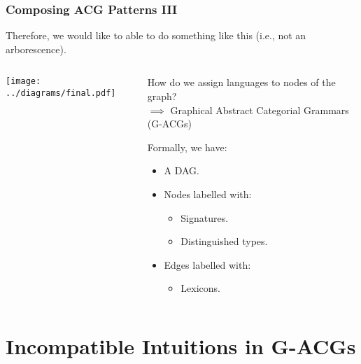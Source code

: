 \documentclass{beamer}
\begin{document}
\begin{frame}
  \frametitle{Composing ACG Patterns III}

  Therefore, we would like to able to do something like this (i.e., not
  an arborescence).

  \begin{columns}[c]
    \begin{column}{0.6\textwidth}
      \begin{center}
        \texttt{[image: ../diagrams/final.pdf]}
      \end{center}
    \end{column}
    \begin{column}{0.4\textwidth}
      How do we assign languages to nodes of the graph? \\
      $\implies$ Graphical Abstract Categorial Grammars (G-ACGs)

      \vspace{5 mm}

      Formally, we have:
        \begin{itemize}
        \item A DAG.
        \item Nodes labelled with:
          \begin{itemize}
          \item Signatures.
          \item Distinguished types.
          \end{itemize}
        \item Edges labelled with:
          \begin{itemize}
          \item Lexicons.
          \end{itemize}
        \end{itemize}
    \end{column}
  \end{columns}
\end{frame}


\section{Incompatible Intuitions in G-ACGs}
\end{document}

